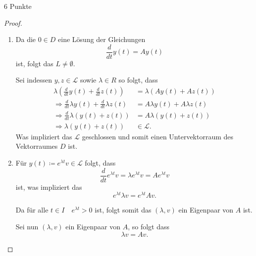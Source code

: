 \documentclass{problemset}
\begin{document}
\begin{problem}[Aufgabe 2]{6 Punkte}
\begin{proof}
    \leavevmode
    \begin{enumerate}
        \item Da die \(0 \in D\) eine Lösung der Gleichungen
              \begin{equation}
                  \frac{d}{dt} y(t) = A y(t)
              \end{equation}
              ist, folgt das \(L \neq \emptyset\).

              Sei indessen \(y, z \in \mathcal{L}\) sowie \(\lambda \in R\) so
              folgt, dass
              \begin{align*}
                  \lambda (\frac{d}{dt} y(t) + \frac{d}{dt} z(t))                   & = \lambda (A y(t) + A z(t))       \\
                  \Rightarrow \frac{d}{dt} \lambda y(t) + \frac{d}{dt} \lambda z(t) & = A \lambda y(t) + A \lambda z(t) \\
                  \Rightarrow \frac{d}{dt} \lambda (y(t) + z(t))                    & = A \lambda (y(t) + z(t))         \\
                  \Rightarrow \lambda (y(t) + z(t))                                 & \in \mathcal{L}.
              \end{align*}
              Was impliziert das \(\mathcal{L}\) geschlossen und somit
              einen Untervektorraum des Vektorraumes \(D\) ist.

        \item Für \(y(t) \coloneq e^{\lambda t}v \in \mathcal{L}\) folgt, dass
              \begin{equation}
                  \frac{d}{dt} e^{\lambda t}v = \lambda e^{\lambda t}v = A e^{\lambda t}v
              \end{equation} ist, was impliziert das
              \begin{equation}
                  e^{\lambda t} \lambda v = e^{\lambda t} Av.
              \end{equation}

              Da für alle \(t \in I \quad e^{\lambda t} > 0\) ist, folgt somit
              das \((\lambda, v)\) ein Eigenpaar von \(A\) ist.

              Sei nun \((\lambda, v)\) ein Eigenpaar von \(A\), so folgt dass
              \begin{equation}
                  \lambda v = Av.
              \end{equation}


\end{enumerate}
\end{proof}
\end{problem}
\end{document}
